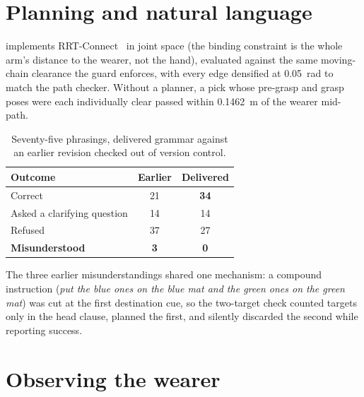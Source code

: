 \section{Planning and natural language}

 implements RRT-Connect~\cite{kuffner2000rrtconnect}
in joint space (the binding constraint is the whole arm's distance to the
wearer, not the hand), evaluated against the same moving-chain clearance the
guard enforces, with every edge densified at \SI{0.05}{\radian} to match the
path checker. Without a planner, a pick whose pre-grasp and grasp poses were
each individually clear passed within \SI{0.1462}{\metre} of the wearer
mid-path.

\begin{table}[htbp]
  \centering
  \small
  \caption[Instruction handling]{Seventy-five phrasings, delivered grammar
  against an earlier revision checked out of version control.}
  \label{tab:phrasings}
  \begin{tabular}{@{}lcc@{}}
    \toprule
    Outcome & Earlier & Delivered \\
    \midrule
    Correct & 21 & \textbf{34} \\
    Asked a clarifying question & 14 & 14 \\
    Refused & 37 & 27 \\
    \textbf{Misunderstood} & \textbf{3} & \textbf{0} \\
    \bottomrule
  \end{tabular}
\end{table}

The three earlier misunderstandings shared one mechanism: a compound
instruction (\emph{put the blue ones on the blue mat and the green ones on
the green mat}) was cut at the first destination cue, so the two-target
check counted targets only in the head clause, planned the first, and
silently discarded the second while reporting success.

\section{Observing the wearer}
\label{sec:wearer-tracking}

